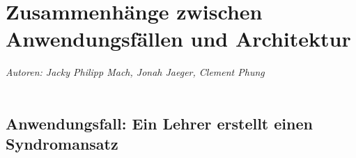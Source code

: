 \documentclass[enabledeprecatedfontcommands,fontsize=11pt,paper=a4,twoside]{scrartcl}
\begin{document}
\newpage{}
\section[Zusammenhänge zwischen Anwendungsfällen und Architektur]{Zusammenhänge zwischen Anwendungsfällen und Architektur}
\label{sec:anwendungsfaelle}
\emph{Autoren: Jacky Philipp Mach, Jonah Jaeger, Clement Phung}\\ \\

\subsection{Anwendungsfall: Ein Lehrer erstellt einen Syndromansatz}
\end{document}

